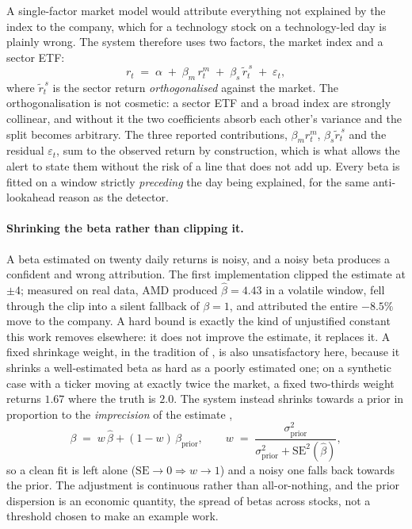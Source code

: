 A single-factor market model would attribute everything not explained by the index to the company,
which for a technology stock on a technology-led day is plainly wrong. The system therefore uses two
factors, the market index and a sector ETF:
\begin{equation}
r_t \;=\; \alpha \;+\; \beta_m\,r^{m}_t \;+\; \beta_s\,\tilde r^{\,s}_t \;+\; \varepsilon_t ,
\label{eq:decomp}
\end{equation}
where $\tilde r^{\,s}_t$ is the sector return \emph{orthogonalised} against the market. The
orthogonalisation is not cosmetic: a sector ETF and a broad index are strongly collinear, and without
it the two coefficients absorb each other's variance and the split becomes arbitrary. The three
reported contributions, $\beta_m r^{m}_t$, $\beta_s \tilde r^{\,s}_t$ and the residual
$\varepsilon_t$, sum to the observed return by construction, which is what allows the alert to state
them without the risk of a line that does not add up. Every beta is fitted on a window strictly
\emph{preceding} the day being explained, for the same anti-lookahead reason as the detector.

\paragraph{Shrinking the beta rather than clipping it.} A beta estimated on twenty daily returns is
noisy, and a noisy beta produces a confident and wrong attribution. The first implementation clipped
the estimate at $\pm 4$; measured on real data, AMD produced $\hat\beta = 4.43$ in a volatile window,
fell through the clip into a silent fallback of $\beta = 1$, and attributed the entire $-8.5\%$ move to
the company. A hard bound is exactly the kind of unjustified constant this work removes elsewhere: it
does not improve the estimate, it replaces it. A fixed shrinkage weight, in the tradition of
\textcite{blume1971risk}, is also unsatisfactory here, because it shrinks a well-estimated beta as
hard as a poorly estimated one; on a synthetic case with a ticker moving at exactly twice the market,
a fixed two-thirds weight returns $1.67$ where the truth is $2.0$. The system instead shrinks towards
a prior in proportion to the \emph{imprecision} of the estimate \autocite{vasicek1973beta},
\begin{equation}
\beta \;=\; w\,\hat\beta + (1-w)\,\beta_{\text{prior}},
\qquad
w \;=\; \frac{\sigma^2_{\text{prior}}}{\sigma^2_{\text{prior}} + \mathrm{SE}^2(\hat\beta)} ,
\label{eq:vasicek}
\end{equation}
so a clean fit is left alone ($\mathrm{SE}\!\to\!0 \Rightarrow w\!\to\!1$) and a noisy one falls back
towards the prior. The adjustment is continuous rather than all-or-nothing, and the prior dispersion is
an economic quantity, the spread of betas across stocks, not a threshold chosen to make an example
work.

